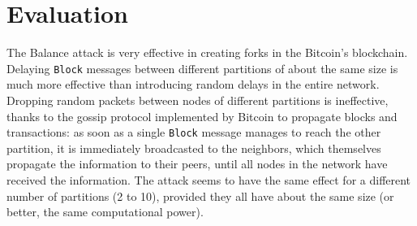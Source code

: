 \section{Evaluation}
The Balance attack is very effective in creating forks in the Bitcoin's blockchain.
Delaying \texttt{Block} messages between different partitions of about the same size is much more effective than introducing random delays in the entire network.
Dropping random packets between nodes of different partitions is ineffective, thanks to the gossip protocol implemented by Bitcoin to propagate blocks and transactions:
as soon as a single \texttt{Block} message manages to reach the other partition, it is immediately broadcasted to the neighbors, which themselves propagate the information to their peers, until all nodes in the network have received the information.
The attack seems to have the same effect for a different number of partitions (\num{2} to \num{10}), provided they all have about the same size (or better, the same computational power).
